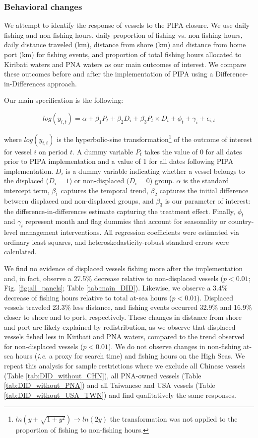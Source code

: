 \documentclass[12pt]{article}
\begin{document}
\subsubsection{Behavioral changes}

We attempt to identify the response of vessels to the PIPA closure. We use daily fishing and non-fishing hours, daily proportion of fishing vs. non-fishing hours, daily distance traveled (km), distance from shore (km) and distance from home port (km) for fishing events, and proportion of total fishing hours allocated to Kiribati waters and PNA waters as our main outcomes of interest. We compare these outcomes before and after the implementation of PIPA using a Difference-in-Differences approach.

Our main specification is the following:

$$
log(y_{i,t}) = \alpha + \beta_1 P_t + \beta_2 D_i + \beta_3 P_t \times D_i + \phi_t + \gamma_i + \epsilon_{i,t}
\label{eqn:did}
$$

\noindent where $log(y_{i,t})$ is the hyperbolic-sine transformation\footnote{$ln\left(y + \sqrt{1 + y^2}\right)\rightarrow ln(2y)$ the transformation was not applied to the proportion of fishing to non-fishing hours.} of the outcome of interest for vessel $i$ on period $t$. A dummy variable $P_t$ takes the value of 0 for all dates prior to PIPA implementation and a value of 1 for all dates following PIPA implementation. $D_i$ is a dummy variable indicating whether a vessel belongs to the displaced ($D_i = 1$) or non-displaced ($D_i = 0$) group. $\alpha$ is the standard intercept term, $\beta_1$ captures the temporal trend, $\beta_2$ captures the initial difference between displaced and non-displaced groups, and $\beta_3$ is our parameter of interest: the difference-in-differences estimate capturing the treatment effect. Finally, $\phi_t$ and $\gamma_i$ represent month and flag dummies that account for seasonality or country-level management interventions. All regression coefficients were estimated via ordinary least squares, and heteroskedasticity-robust standard errors were calculated.

We find no evidence of displaced vessels fishing more after the implementation and, in fact, observe a 27.5\% decrease relative to non-displaced vessels ($p < 0.01$; Fig. \ref{fig:all_panels}; Table \ref{tab:main_DID}). Likewise, we observe a 3.4\% decrease of fishing hours relative to total at-sea hours ($p < 0.01$). Displaced vessels traveled 23.3\% less distance, and fishing events occurred 32.9\% and 16.9\% closer to shore and to port, respectively. These changes in distance from shore and port are likely explained by redistribution, as we observe that displaced vessels fished less in Kiribati and PNA waters, compared to the trend observed for non-displaced vessels ($p < 0.01$). We do not observe changes in non-fishing at-sea hours (\emph{i.e.} a proxy for search time) and fishing hours on the High Seas. We repeat this analysis for sample restrictions where we exclude all Chinese vessels (Table \ref{tab:DID_without_CHN}), all PNA-owned vessels (Table \ref{tab:DID_without_PNA}) and all Taiwanese and USA vessels (Table \ref{tab:DID_without_USA_TWN}) and find qualitatively the same responses.
\end{document}
